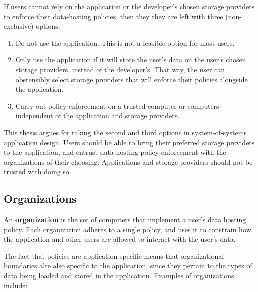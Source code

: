 If users cannot rely on the application or the developer's chosen storage providers
to enforce their data-hosting policies, then they they are left with three
(non-exclusive) options:

\begin{enumerate}
   \item Do not use the application.  This is not a feasible option for
      most users.
   \item Only use the application if it will store the user's data on the user's
      chosen storage providers, instead of the developer's.  That
      way, the user can obstensibly select storage providers that will enforce 
      their policies alongside the application.
   \item Carry out policy enforcement on a trusted computer or computers
      independent of the application and storage providers.
\end{enumerate}

This thesis argues for taking the second and third options in system-of-systems
application design.  Users should be able to
bring their preferred storage providers to the application, and entrust
data-hosting policy enforcement with the organizations of their choosing.
Applications and storage providers should not be trusted with doing so.

\subsection{Organizations}

An \textbf{organization} is the set of computers that implement a user's
data hosting policy.  Each organization adheres to a single
policy, and uses it to constrain how the application and other users are allowed to
interact with the user's data.

The fact that policies are application-specific means that organizational boundaries
alre also specific to the application, since they pertain to the types of data being loaded
and stored in the application.  Examples of organizations include:

